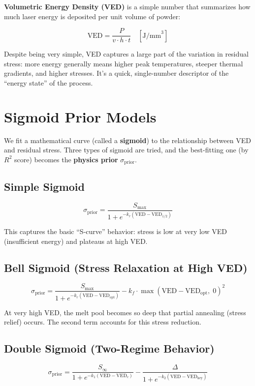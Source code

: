 \documentclass[12pt,a4paper]{report}
\begin{document}
\textbf{Volumetric Energy Density (VED)} is a simple number that summarizes how much laser energy is deposited per unit volume of powder:

\begin{equation}
\text{VED} = \frac{P}{v \cdot h \cdot t} \quad \left[\text{J/mm}^3\right]
\label{eq:ved}
\end{equation}

Despite being very simple, VED captures a large part of the variation in residual stress: more energy generally means higher peak temperatures, steeper thermal gradients, and higher stresses. It's a quick, single-number descriptor of the ``energy state'' of the process.

\section{Sigmoid Prior Models}

We fit a mathematical curve (called a \textbf{sigmoid}) to the relationship between VED and residual stress. Three types of sigmoid are tried, and the best-fitting one (by $R^2$ score) becomes the \textbf{physics prior} $\sigma_{\text{prior}}$.

\subsection{Simple Sigmoid}
\begin{equation}
\sigma_{\text{prior}} = \frac{S_{\max}}{1 + e^{-k_r(\text{VED} - \text{VED}_{1/2})}}
\end{equation}

This captures the basic ``S-curve'' behavior: stress is low at very low VED (insufficient energy) and plateaus at high VED.

\subsection{Bell Sigmoid (Stress Relaxation at High VED)}
\begin{equation}
\sigma_{\text{prior}} = \frac{S_{\max}}{1 + e^{-k_r(\text{VED} - \text{VED}_{\text{opt}})}} - k_f \cdot \max(\text{VED} - \text{VED}_{\text{opt}},\; 0)^2
\end{equation}

At very high VED, the melt pool becomes so deep that partial annealing (stress relief) occurs. The second term accounts for this stress reduction.

\subsection{Double Sigmoid (Two-Regime Behavior)}
\begin{equation}
\sigma_{\text{prior}} = \frac{S_\infty}{1 + e^{-k_1(\text{VED} - \text{VED}_c)}} - \frac{\Delta}{1 + e^{-k_2(\text{VED} - \text{VED}_{\text{key}})}}
\end{equation}
\end{document}
